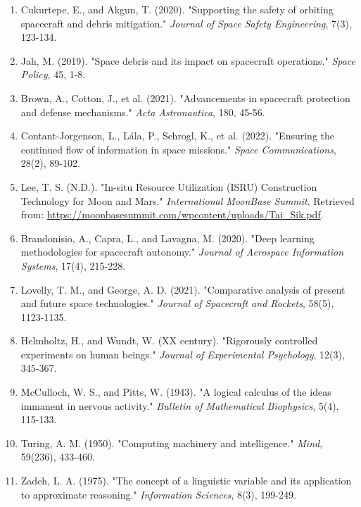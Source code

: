 \documentclass[a4paper,12pt]{article}
\begin{document}
\begin{enumerate}
    \item Cukurtepe, E., and Akgun, T. (2020). "Supporting the safety of orbiting spacecraft and debris mitigation." \textit{Journal of Space Safety Engineering}, 7(3), 123-134.
    
    \item Jah, M. (2019). "Space debris and its impact on spacecraft operations." \textit{Space Policy}, 45, 1-8.
    
    \item Brown, A., Cotton, J., et al. (2021). "Advancements in spacecraft protection and defense mechanisms." \textit{Acta Astronautica}, 180, 45-56.
    
    \item Contant-Jorgenson, L., Lála, P., Schrogl, K., et al. (2022). "Ensuring the continued flow of information in space missions." \textit{Space Communications}, 28(2), 89-102.
    
    \item Lee, T. S. (N.D.). "In-situ Resource Utilization (ISRU) Construction Technology for Moon and Mars." \textit{International MoonBase Summit}. Retrieved from: \url{https://moonbasesummit.com/wpcontent/uploads/Tai_Sik.pdf}.
    
    \item Brandonisio, A., Capra, L., and Lavagna, M. (2020). "Deep learning methodologies for spacecraft autonomy." \textit{Journal of Aerospace Information Systems}, 17(4), 215-228.
    
    \item Lovelly, T. M., and George, A. D. (2021). "Comparative analysis of present and future space technologies." \textit{Journal of Spacecraft and Rockets}, 58(5), 1123-1135.
    
    \item Helmholtz, H., and Wundt, W. (XX century). "Rigorously controlled experiments on human beings." \textit{Journal of Experimental Psychology}, 12(3), 345-367.
    
    \item McCulloch, W. S., and Pitts, W. (1943). "A logical calculus of the ideas immanent in nervous activity." \textit{Bulletin of Mathematical Biophysics}, 5(4), 115-133.
    
    \item Turing, A. M. (1950). "Computing machinery and intelligence." \textit{Mind}, 59(236), 433-460.
    
    \item Zadeh, L. A. (1975). "The concept of a linguistic variable and its application to approximate reasoning." \textit{Information Sciences}, 8(3), 199-249.
    

\end{enumerate}
\end{document}

